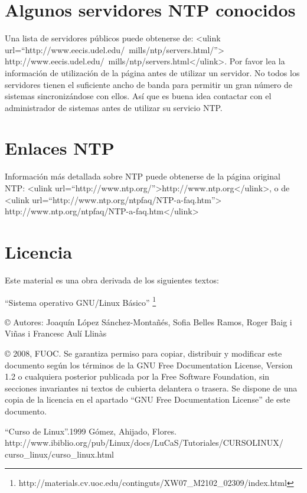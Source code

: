 \documentclass[12pt]{article}
\begin{document}
\section*{ Algunos servidores NTP conocidos}


Una lista de servidores públicos puede obtenerse de:
<ulink url=``http://www.eecis.udel.edu/~mills/ntp/servers.html/''>
	http://www.eecis.udel.edu/~mills/ntp/servers.html</ulink>. Por favor lea la
información de utilización de la página antes de utilizar un servidor. No 
todos los servidores tienen el suficiente ancho de banda para permitir 
un gran número de sistemas sincronizándose con ellos. Así que es buena 
idea contactar con el administrador de sistemas antes de utilizar su 
servicio NTP.



\section*{ Enlaces NTP}


Información más detallada sobre NTP puede obtenerse de la página
original NTP: <ulink url=``http://www.ntp.org/''>http://www.ntp.org</ulink>, o de
<ulink url=``http://www.ntp.org/ntpfaq/NTP-a-faq.htm''>
	http://www.ntp.org/ntpfaq/NTP-a-faq.htm</ulink>


\section*{Licencia}

Este material es una obra derivada de los siguientes textos:

``Sistema operativo GNU/Linux Básico'' \footnote{http://materials.cv.uoc.edu/continguts/XW07\_M2102\_02309/index.html}

© Autores: Joaquín López Sánchez-Montañés, Sofia Belles Ramos, Roger Baig i Viñas i Francesc Aulí Llinàs

© 2008, FUOC. Se garantiza permiso para copiar, distribuir y modificar este documento según los
términos de la GNU Free Documentation License, Version 1.2 o cualquiera posterior publicada por la
Free Software Foundation, sin secciones invariantes ni textos de cubierta delantera o trasera. Se dispone
de una copia de la licencia en el apartado ``GNU Free Documentation License'' de este documento.

\begin{thebibliography}{1}
 ``Curso de Linux''.1999 Gómez, Ahijado, Flores.\\ 
http://www.ibiblio.org/pub/Linux/docs/LuCaS/Tutoriales/CURSOLINUX/\\curso\_linux/curso\_linux.html
\end{thebibliography}
\end{document}
